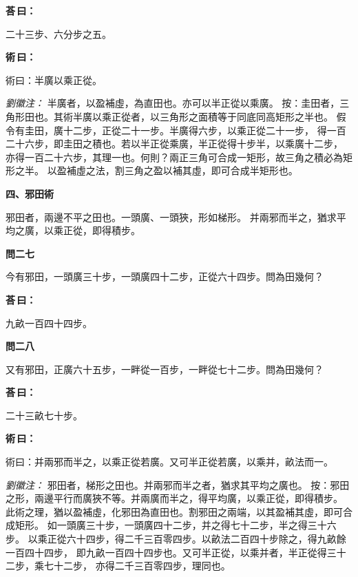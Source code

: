 \documentclass[11pt,a4paper]{article}
\newenvironment{problem}[1][]{%
  \par\vspace{0.6em}\noindent\textcolor{problemcolor}{\textbf{問\ignorespaces#1\unskip}\hspace{0.5em}}%
  \ignorespaces
}{\par\vspace{0.4em}}
\newenvironment{answer}{%
  \par\noindent\textcolor{answercolor}{\textbf{荅\,曰：}}%
  \ignorespaces
}{\par\vspace{0.3em}}
\newenvironment{method}{%
  \par\noindent\textcolor{methodcolor}{\textbf{術\,曰：}}%
  \ignorespaces
}{\par\vspace{0.4em}}
\newenvironment{liuhuicomm}{%
  \par\vspace{0.3em}\noindent\textcolor{commentarycolor}{\small\textit{劉徽注：}}}%
  {\par\vspace{0.5em}}
\begin{document}
\begin{answer}
二十三步、六分步之五。
\end{answer}

\begin{method}
術曰：半廣以乘正從。
\end{method}

\begin{liuhuicomm}
半廣者，以盈補虛，為直田也。亦可以半正從以乘廣。
按：圭田者，三角形田也。其術半廣以乘正從者，以三角形之面積等于同底同高矩形之半也。
假令有圭田，廣十二步，正從二十一步。半廣得六步，以乘正從二十一步，
得一百二十六步，即圭田之積也。若以半正從乘廣，半正從得十步半，以乘廣十二步，
亦得一百二十六步，其理一也。何則？兩正三角可合成一矩形，故三角之積必為矩形之半。
以盈補虛之法，割三角之盈以補其虛，即可合成半矩形也。
\end{liuhuicomm}

\vspace{0.8em}
\noindent\textbf{\large 四、邪田術}
\vspace{0.5em}

\noindent 邪田者，兩邊不平之田也。一頭廣、一頭狹，形如梯形。
并兩邪而半之，猶求平均之廣，以乘正從，即得積步。

\begin{problem}[二七]
今有邪田，一頭廣三十步，一頭廣四十二步，正從六十四步。問為田幾何？
\end{problem}

\begin{answer}
九畝一百四十四步。
\end{answer}

\begin{problem}[二八]
又有邪田，正廣六十五步，一畔從一百步，一畔從七十二步。問為田幾何？
\end{problem}

\begin{answer}
二十三畝七十步。
\end{answer}

\begin{method}
術曰：并兩邪而半之，以乘正從若廣。又可半正從若廣，以乘并，畝法而一。
\end{method}

\begin{liuhuicomm}
邪田者，梯形之田也。并兩邪而半之者，猶求其平均之廣也。
按：邪田之形，兩邊平行而廣狹不等。并兩廣而半之，得平均廣，以乘正從，即得積步。
此術之理，猶以盈補虛，化邪田為直田也。割邪田之兩端，以其盈補其虛，即可合成矩形。
如一頭廣三十步，一頭廣四十二步，并之得七十二步，半之得三十六步。
以乘正從六十四步，得二千三百零四步。以畝法二百四十步除之，得九畝餘一百四十四步，
即九畝一百四十四步也。又可半正從，以乘并者，半正從得三十二步，乘七十二步，
亦得二千三百零四步，理同也。
\end{liuhuicomm}
\end{document}

